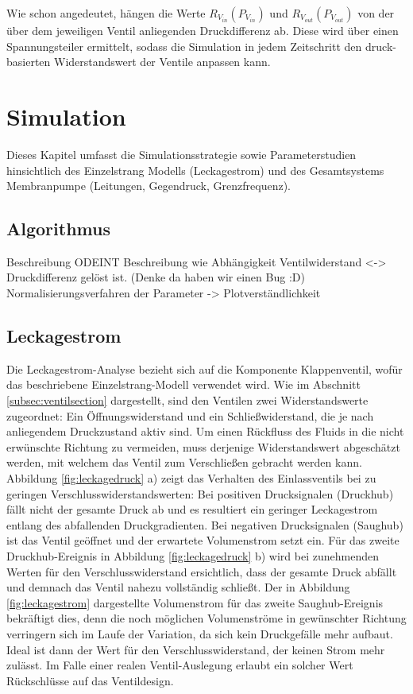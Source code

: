 \documentclass[fontsize=12pt, a4paper]{scrartcl}
\begin{document}
Wie schon angedeutet, hängen die Werte $R_{V_{in}}(P_{V_{in}})$ und $R_{V_{out}}(P_{V_{out}})$ von der über dem jeweiligen Ventil anliegenden Druckdifferenz ab. Diese wird über einen Spannungsteiler ermittelt, sodass die Simulation in jedem Zeitschritt den druck-basierten Widerstandswert der Ventile anpassen kann.

\section{Simulation}

Dieses Kapitel umfasst die Simulationsstrategie sowie Parameterstudien hinsichtlich des Einzelstrang Modells (Leckagestrom) und des Gesamtsystems Membranpumpe (Leitungen, Gegendruck, Grenzfrequenz).

\subsection{Algorithmus}

Beschreibung ODEINT
Beschreibung wie Abhängigkeit Ventilwiderstand <-> Druckdifferenz gelöst ist. (Denke da haben wir einen Bug :D)
Normalisierungsverfahren der Parameter -> Plotverständlichkeit

\subsection{Leckagestrom}

Die Leckagestrom-Analyse bezieht sich auf die Komponente Klappenventil, wofür das beschriebene Einzelstrang-Modell verwendet wird. Wie im Abschnitt \ref{subsec:ventilsection} dargestellt, sind den Ventilen zwei Widerstandswerte zugeordnet: Ein Öffnungswiderstand und ein Schließwiderstand, die je nach anliegendem Druckzustand aktiv sind. Um einen Rückfluss des Fluids in die nicht erwünschte Richtung zu vermeiden, muss derjenige Widerstandswert abgeschätzt werden, mit welchem das Ventil zum Verschließen gebracht werden kann. Abbildung \ref{fig:leckagedruck} a) zeigt das Verhalten des Einlassventils bei zu geringen Verschlusswiderstandswerten: Bei positiven Drucksignalen (Druckhub) fällt nicht der gesamte Druck ab und es resultiert ein geringer Leckagestrom entlang des abfallenden Druckgradienten. Bei negativen Drucksignalen (Saughub) ist das Ventil geöffnet und der erwartete Volumenstrom setzt ein. Für das zweite Druckhub-Ereignis in Abbildung \ref{fig:leckagedruck} b) wird bei zunehmenden Werten für den Verschlusswiderstand ersichtlich, dass der gesamte Druck abfällt und demnach das Ventil nahezu vollständig schließt. Der in  Abbildung \ref{fig:leckagestrom} dargestellte Volumenstrom für das zweite Saughub-Ereignis bekräftigt dies, denn die noch möglichen Volumenströme in gewünschter Richtung verringern sich im Laufe der Variation, da sich kein Druckgefälle mehr aufbaut. Ideal ist dann der Wert für den Verschlusswiderstand, der keinen Strom mehr zulässt. Im Falle einer realen Ventil-Auslegung erlaubt ein solcher Wert Rückschlüsse auf das Ventildesign.
\end{document}
